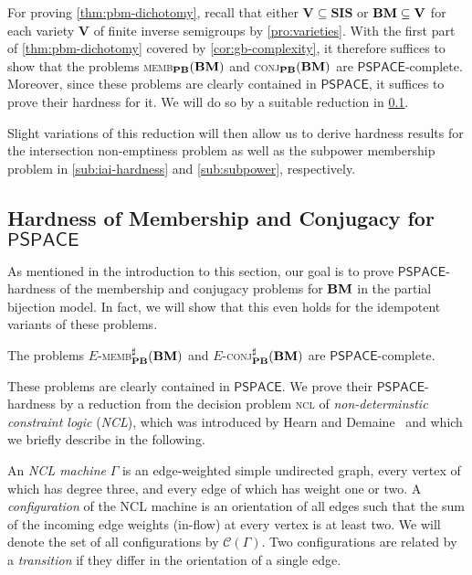 \documentclass[anonymous,letter,UKenglish,cleveref,autoref,thm-restate]{lipics-v2021}
\newcommand{\sse}{\subseteq}
\newcommand{\PSPACE}{\ensuremath{\mathsf{PSPACE}}\xspace}
\newcommand{\vV}{\ensuremath{\mathbf{V}}}
\newcommand{\vSI}{\ensuremath{\mathbf{SIS}}}
\newcommand{\cC}{\mathcal{C}}
\theoremstyle{plain}
\theoremstyle{plain}
\newcommand{\dMemb}[2][]{\textup{\textsc{memb${}_{\mathbf{#1}}\expandafter\ifx\expandafter\relax\detokenize{#2}\relax\else(#2)\fi$}}}
\newcommand{\dConj}[2][]{\textup{\textsc{conj${}_{\mathbf{#1}}\expandafter\ifx\expandafter\relax\detokenize{#2}\relax\else(#2)\fi$}}}
\newcommand{\dMembS}[2][]{\textup{\textsc{memb${}^{\sharp}_{\mathbf{#1}}\expandafter\ifx\expandafter\relax\detokenize{#2}\relax\else(#2)\fi$}}}
\newcommand{\dConjS}[2][]{\textup{\textsc{conj${}^{\sharp}_{\mathbf{#1}}\expandafter\ifx\expandafter\relax\detokenize{#2}\relax\else(#2)\fi$}}}
\newcommand{\prob}[1]{\textup{\textsc{#1}}\xspace}
\newcommand{\dNCL}{\prob{ncl}}
\newcommand{\dEMembS}[2][]{\ensuremath{E}\textnormal{-}\dMembS[#1]{#2}}
\newcommand{\dEConjS}[2][]{\ensuremath{E}\textnormal{-}\dConjS[#1]{#2}}
\begin{document}
For proving \cref{thm:pbm-dichotomy}, recall that either $\vV \sse \vSI$ or $\vBM \sse \vV$ for each variety $\vV$ of finite inverse semigroups by \cref{pro:varieties}.
With the first part of \cref{thm:pbm-dichotomy} covered by \cref{cor:gb-complexity}, it therefore suffices to show that the problems \dMemb[PB]{\vBM} and \dConj[PB]{\vBM} are \PSPACE-complete.
Moreover, since these problems are clearly contained in \PSPACE{}, it suffices to prove their hardness for it.
We will do so by a suitable reduction in \cref{sub:pbm-hardness}.

Slight variations of this reduction will then allow us to derive hardness results for the intersection non-emptiness problem as well as the subpower membership problem in \cref{sub:iai-hardness} and \cref{sub:subpower}, respectively.


\subsection{Hardness of Membership and Conjugacy for \PSPACE}\label{sub:pbm-hardness}

As mentioned in the introduction to this section, our goal is to prove \PSPACE-hardness of the membership and conjugacy problems for $\mathbf{BM}$ in the partial bijection model.
In fact, we will show that this even holds for the idempotent variants of these problems.

\begin{theorem}\label{thm:pbm-hardness}
  The problems \dEMembS[PB]{\vBM} and \dEConjS[PB]{\vBM} are \PSPACE-complete.
\end{theorem}



These problems are clearly contained in \PSPACE{}.
We prove their \PSPACE-hardness by a reduction from the decision problem \dNCL of \emph{non-determinstic constraint logic} (\emph{NCL}), which was introduced by Hearn and Demaine~\cite{HearnD05} and which we briefly describe in the following.

An \emph{NCL machine} $\Gamma$ is an edge-weighted simple undirected graph, every vertex of which has degree three, and every edge of which has weight one or two.
A \emph{configuration} of the NCL machine is an orientation of all edges such that the sum of the incoming edge weights (in-flow) at every vertex is at least two.
We will denote the set of all configurations by $\cC(\Gamma)$.
Two configurations are related by a \emph{transition} if they differ in the orientation of a single edge.
\end{document}
